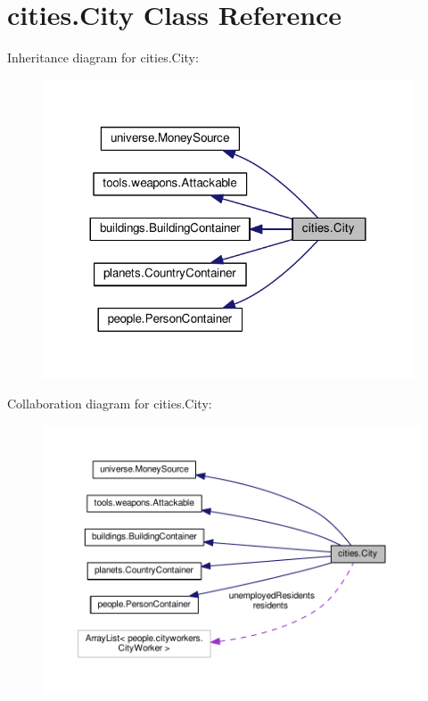 \hypertarget{classcities_1_1_city}{}\section{cities.\+City Class Reference}
\label{classcities_1_1_city}


Inheritance diagram for cities.\+City\+:\nopagebreak
\begin{figure}[H]
\begin{center}
\leavevmode
\includegraphics[width=311pt]{classcities_1_1_city__inherit__graph}
\end{center}
\end{figure}


Collaboration diagram for cities.\+City\+:\nopagebreak
\begin{figure}[H]
\begin{center}
\leavevmode
\includegraphics[width=350pt]{classcities_1_1_city__coll__graph}
\end{center}
\end{figure}
